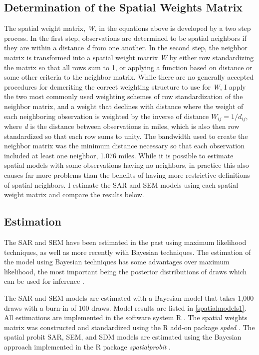 \subsection{Determination of the Spatial Weights Matrix}
The spatial weight matrix, \textit{W}, in the equations above is developed by a two step process.  In the first step, observations are determined to be spatial neighbors if they are within a distance \textit{d} from one another.  In the second step, the neighbor matrix is transformed into a spatial weight matrix \textit{W} by either row standardizing the matrix so that all rows sum to 1, or applying a function based on distance or some other criteria to the neighbor matrix.    While there are no generally accepted procedures for demeriting the correct weighting structure to use for \textit{W}, I apply the two most commonly used weighting schemes of row standardization of the neighbor matrix, and a weight that declines with distance where the weight of each neighboring observation is weighted by the inverse of distance $W_{ij} = 1/d_{ij}$, where \textit{d} is the distance between observations in miles, which is also then row standardized so that each row sums to unity.  The bandwidth used to create the neighbor matrix was the minimum distance necessary so that each observation included at least one neighbor, 1.076 miles. While it is possible to estimate spatial models with some observations having no neighbors, in practice this also causes far more problems than the benefits of having more restrictive definitions of spatial neighbors.  I estimate the SAR and SEM models using each spatial weight matrix and compare the results below.

\subsection{Estimation}
The SAR and SEM have been estimated in the past using maximum likelihood techniques, as well as more recently with Bayesian techniques.  The estimation of the model using Bayesian techniques has some advantages over maximum likelihood, the most important being the posterior distributions of draws which can be used for inference \citep{LeSage2000}.  

The SAR and SEM models are estimated with a Bayesian model that takes 1,000 draws with a burn-in of 100 draws.  Model results are listed in \autoref{spatialmodels1}.  All estimations are implemented in the software system R \citep{RCoreTeam2014}.  The spatial weights matrix was constructed and standardized using the R add-on package \textit{spded} \citep{Bivand2013m,Bivand2015}.%
The spatial probit SAR, SEM, and SDM models are estimated using the Bayesian approach implemented in the R package \textit{spatialprobit} \citep{Wilhelm2014}.%

